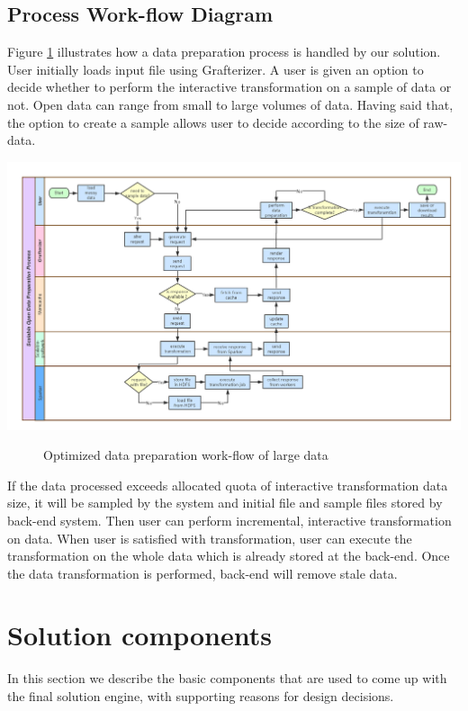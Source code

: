 \subsection{Process Work-flow Diagram}
Figure \ref{fig:workflow} illustrates how a data preparation process is handled by our solution. User initially loads input file using Grafterizer. A user is given an option to decide whether to perform the interactive transformation on a sample of data or not. Open data can range from small to large volumes of data. Having said that, the option to create a sample allows user to decide according to the size of raw-data. 
\begin{center}
	\includegraphics[width=55em, angle=90]{./Figures/work-flow}
	\begin{figure}[htbp]
    \caption{Optimized data preparation work-flow of large data}
    \label{fig:workflow}
	\end{figure}
\end{center}
If the data processed exceeds allocated quota of interactive transformation data size, it will be sampled by the system and initial file and sample files stored by back-end system. Then user can perform incremental, interactive transformation on data. When user is satisfied with transformation, user can execute the transformation on the whole data which is already stored at the back-end. Once the data transformation is performed, back-end will remove stale data.

\section{Solution components}
In this section we describe the basic components that are used to come up with the final solution engine, with supporting reasons for design decisions. 


